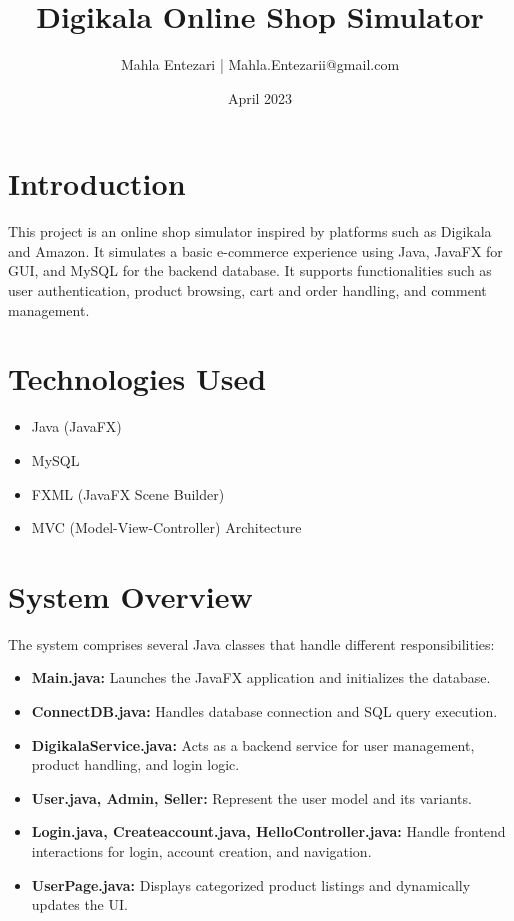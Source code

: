 \documentclass[12pt]{article}
\title{\textbf{Digikala Online Shop Simulator}}
\author{Mahla Entezari | Mahla.Entezarii@gmail.com}
\date{April 2023}
\begin{document}
\maketitle

\section{Introduction}
This project is an online shop simulator inspired by platforms such as Digikala and Amazon. It simulates a basic e-commerce experience using Java, JavaFX for GUI, and MySQL for the backend database. It supports functionalities such as user authentication, product browsing, cart and order handling, and comment management.

\section{Technologies Used}
\begin{itemize}
    \item Java (JavaFX)
    \item MySQL
    \item FXML (JavaFX Scene Builder)
    \item MVC (Model-View-Controller) Architecture
\end{itemize}

\section{System Overview}
The system comprises several Java classes that handle different responsibilities:

\begin{itemize}
    \item \textbf{Main.java:} Launches the JavaFX application and initializes the database.
    \item \textbf{ConnectDB.java:} Handles database connection and SQL query execution.
    \item \textbf{DigikalaService.java:} Acts as a backend service for user management, product handling, and login logic.
    \item \textbf{User.java, Admin, Seller:} Represent the user model and its variants.
    \item \textbf{Login.java, Createaccount.java, HelloController.java:} Handle frontend interactions for login, account creation, and navigation.
    \item \textbf{UserPage.java:} Displays categorized product listings and dynamically updates the UI.
\end{itemize}
\end{document}
